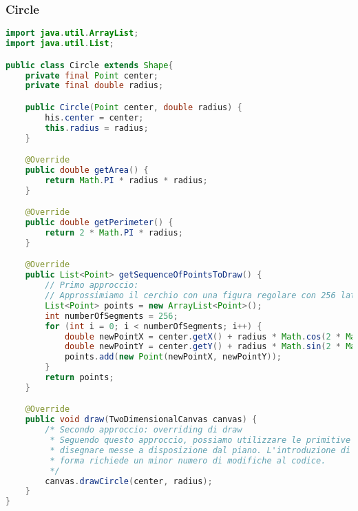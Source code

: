 \documentclass{article}
\begin{document}
\subsubsection{Circle}
\begin{lstlisting}[language=Java,escapechar=|]
import java.util.ArrayList;
import java.util.List;

public class Circle extends Shape{
	private final Point center;
	private final double radius;

	public Circle(Point center, double radius) {
		his.center = center;
		this.radius = radius;
	}

	@Override
	public double getArea() {
		return Math.PI * radius * radius;
	}

	@Override
	public double getPerimeter() {
		return 2 * Math.PI * radius;
	}

	@Override
	public List<Point> getSequenceOfPointsToDraw() {
		// Primo approccio: 
		// Approssimiamo il cerchio con una figura regolare con 256 lati
		List<Point> points = new ArrayList<Point>();
		int numberOfSegments = 256;
		for (int i = 0; i < numberOfSegments; i++) {
			double newPointX = center.getX() + radius * Math.cos(2 * Math.PI * i / numberOfSegments);
			double newPointY = center.getY() + radius * Math.sin(2 * Math.PI * i / numberOfSegments);
			points.add(new Point(newPointX, newPointY));
		}
		return points;
	}

	@Override
	public void draw(TwoDimensionalCanvas canvas) {
		/* Secondo approccio: overriding di draw
		 * Seguendo questo approccio, possiamo utilizzare le primitive per
		 * disegnare messe a disposizione dal piano. L'introduzione di una nuova
		 * forma richiede un minor numero di modifiche al codice.
		 */
		canvas.drawCircle(center, radius);
	}
}
\end{lstlisting}
\end{document}
